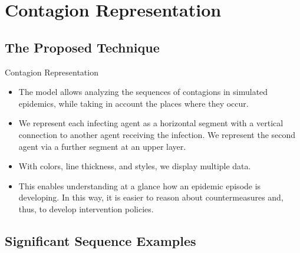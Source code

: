 \documentclass[8pt]{beamer}
\begin{document}
\section{Contagion Representation}

\subsection{The Proposed Technique}

\begin{frame}{Contagion Representation}

  \begin{itemize}
  \item
The model allows analyzing the sequences of contagions in simulated epidemics, while taking in account the places where they occur. 
  \item
We represent each infecting agent as a horizontal segment with a vertical connection to another agent receiving the infection. 
We represent the second agent via a further segment at an upper layer. 

  \item
With colors, line thickness, and styles, we display multiple data. 

  \item
This enables understanding at a glance how an epidemic episode is developing. In this way, it is easier to reason about countermeasures and, thus, to develop intervention policies.

  \end{itemize}
\end{frame}


\subsection{Significant Sequence Examples}
\end{document}
